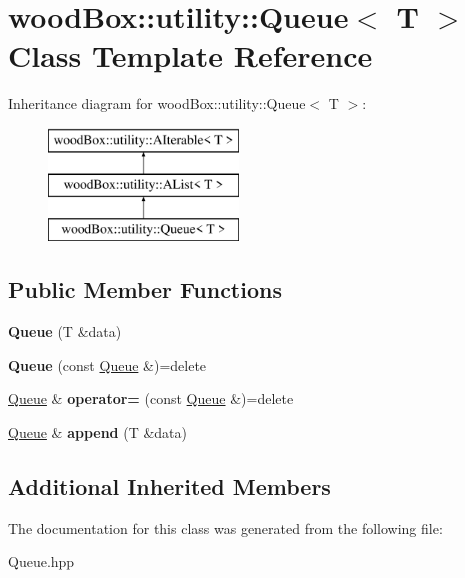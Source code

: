\hypertarget{classwood_box_1_1utility_1_1_queue}{}\section{wood\+Box\+:\+:utility\+:\+:Queue$<$ T $>$ Class Template Reference}
\label{classwood_box_1_1utility_1_1_queue}
Inheritance diagram for wood\+Box\+:\+:utility\+:\+:Queue$<$ T $>$\+:\begin{figure}[H]
\begin{center}
\leavevmode
\includegraphics[height=3.000000cm]{classwood_box_1_1utility_1_1_queue}
\end{center}
\end{figure}
\subsection*{Public Member Functions}
\begin{DoxyCompactItemize}
\item 
\mbox{\label{classwood_box_1_1utility_1_1_queue_a3fd68bd9b7d12606445926b4e26e763c}} 
{\bfseries Queue} (T \&data)
\item 
\mbox{\label{classwood_box_1_1utility_1_1_queue_a811d00da7a7cefd7e3551a1381396a96}} 
{\bfseries Queue} (const \mbox{\hyperlink{classwood_box_1_1utility_1_1_queue}{Queue}} \&)=delete
\item 
\mbox{\label{classwood_box_1_1utility_1_1_queue_a2c9fea4bcd5ee866d5d81b80a4ff6c6d}} 
\mbox{\hyperlink{classwood_box_1_1utility_1_1_queue}{Queue}} \& {\bfseries operator=} (const \mbox{\hyperlink{classwood_box_1_1utility_1_1_queue}{Queue}} \&)=delete
\item 
\mbox{\label{classwood_box_1_1utility_1_1_queue_a027d2b2c9fe678f913ddaf462b37669c}} 
\mbox{\hyperlink{classwood_box_1_1utility_1_1_queue}{Queue}} \& {\bfseries append} (T \&data)
\end{DoxyCompactItemize}
\subsection*{Additional Inherited Members}


The documentation for this class was generated from the following file\+:\begin{DoxyCompactItemize}
\item 
Queue.\+hpp\end{DoxyCompactItemize}
